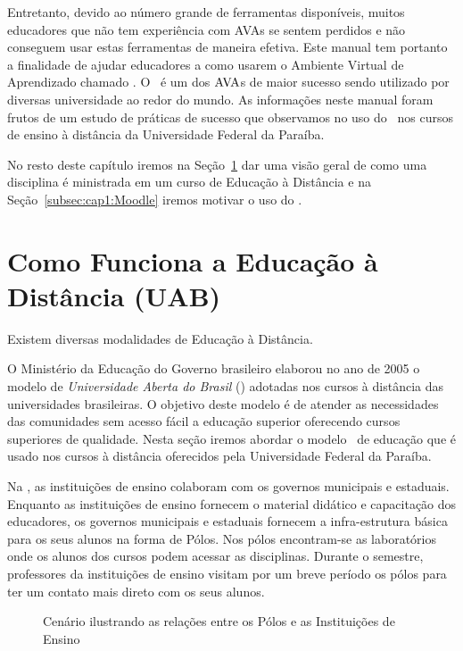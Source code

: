 Entretanto, devido ao número grande de ferramentas disponíveis, muitos educadores que não tem experiência 
com AVAs se sentem perdidos e não conseguem usar estas ferramentas de maneira efetiva. 
Este manual tem portanto a finalidade de ajudar educadores a como usarem o Ambiente Virtual de Aprendizado
chamado \emph{\moodle}. O \moodle\ é um dos $\hbox{AVA}$s de maior sucesso sendo utilizado por diversas 
universidade ao redor do mundo. As informações neste manual foram frutos de um 
estudo de práticas de sucesso que observamos no uso do \moodle\ 
nos cursos de ensino à distância da Universidade Federal da Paraíba. 

No resto deste capítulo iremos na Seção~\ref{subsec:cap1:Ead} dar uma visão geral de como uma disciplina
é ministrada em um curso de Educação à Distância e na Seção~\ref{subsec:cap1:Moodle} iremos motivar o
uso do \moodle.

\section{Como Funciona a Educação à Distância (UAB)}
\label{subsec:cap1:Ead}

Existem diversas modalidades de Educação à Distância.  

O Ministério da Educação do Governo brasileiro elaborou no ano de 2005 o modelo de 
\emph{Universidade Aberta do Brasil} (\uab) adotadas nos cursos à distância das 
universidades brasileiras. O objetivo deste modelo é de atender as necessidades 
das comunidades sem acesso fácil a educação superior oferecendo cursos superiores de qualidade.
Nesta seção iremos abordar o modelo \uab\ de educação que é usado nos cursos à distância oferecidos pela
Universidade Federal da Paraíba.

Na \uab, as instituições de ensino colaboram com os governos municipais e 
estaduais. Enquanto as instituições de ensino fornecem o material didático e capacitação 
dos educadores, os governos municipais e estaduais fornecem a infra-estrutura básica 
para os seus alunos na forma de Pólos. Nos pólos encontram-se as laboratórios onde
os alunos dos cursos podem acessar as disciplinas. Durante o semestre, professores
da instituições de ensino visitam por um breve período os pólos para ter um contato mais direto com os 
seus alunos. 
\begin{figure}[htbp]
 \begin{center}
  \caption{Cenário ilustrando as relações entre os Pólos e as Instituições de Ensino}
  \label{fig:UAB}
 \end{center}
\end{figure}

